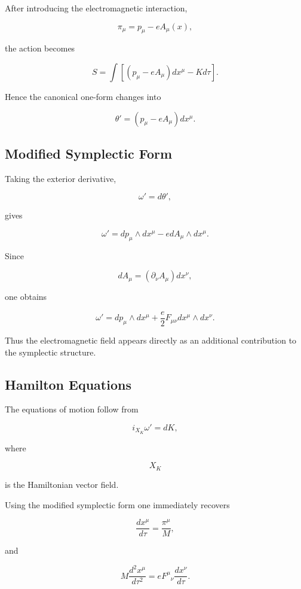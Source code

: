 After introducing the electromagnetic interaction,

\[
\pi_\mu
=
p_\mu-eA_\mu(x),
\]

the action becomes

\[
S
=
\int
\left[
(p_\mu-eA_\mu)
dx^\mu
-
K
d\tau
\right].
\]

Hence the canonical one-form changes into

\[
\boxed{
\theta'
=
(p_\mu-eA_\mu)
dx^\mu .
}
\]


\subsection{Modified Symplectic Form}

Taking the exterior derivative,

\[
\omega'
=
d\theta',
\]

gives

\[
\omega'
=
dp_\mu
\wedge
dx^\mu
-
e
dA_\mu
\wedge
dx^\mu.
\]

Since

\[
dA_\mu
=
(\partial_\nu A_\mu)
dx^\nu,
\]

one obtains

\[
\boxed{
\omega'
=
dp_\mu
\wedge
dx^\mu
+
\frac{e}{2}
F_{\mu\nu}
dx^\mu
\wedge
dx^\nu .
}
\]

Thus the electromagnetic field appears directly as an additional
contribution to the symplectic structure.


\subsection{Hamilton Equations}

The equations of motion follow from

\[
i_{X_K}\omega'
=
dK,
\]

where

\[
X_K
\]

is the Hamiltonian vector field.

Using the modified symplectic form one immediately recovers

\[
\frac{dx^\mu}{d\tau}
=
\frac{\pi^\mu}{M},
\]

and

\[
\boxed{
M
\frac{d^2x^\mu}{d\tau^2}
=
e
F^\mu{}_\nu
\frac{dx^\nu}{d\tau}.
}
\]

